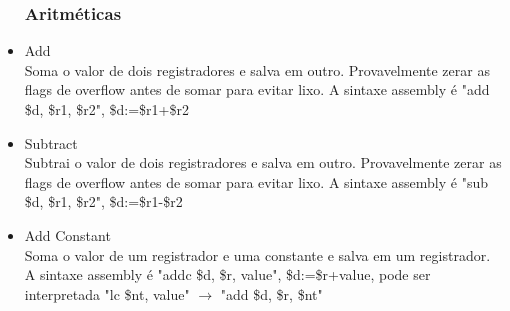 \documentclass[a4paper, 10pt]{article}
\begin{document}
\begin{itemize}
	\subsubsection{Aritméticas}
	\item Add\\
	Soma o valor de dois registradores e salva em outro. Provavelmente zerar as flags de overflow antes de somar para evitar lixo. A sintaxe assembly é "add \$d, \$r1, \$r2", \$d:=\$r1+\$r2
	\item Subtract\\
	Subtrai o valor de dois registradores e salva em outro. Provavelmente zerar as flags de overflow antes de somar para evitar lixo. A sintaxe assembly é "sub \$d, \$r1, \$r2", \$d:=\$r1-\$r2
	\item Add Constant\\
	Soma o valor de um registrador e uma constante e salva em um registrador. A sintaxe assembly é "addc \$d, \$r, value", \$d:=\$r+value, pode ser interpretada "lc \$nt, value" $\rightarrow$ "add \$d, \$r, \$nt"

\end{itemize}
\end{document}
